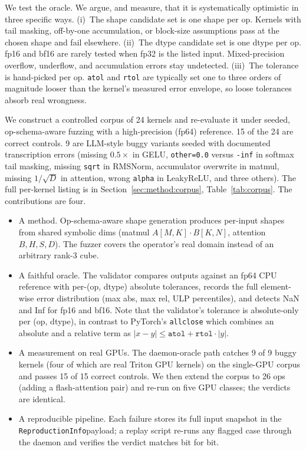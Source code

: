 \documentclass[runningheads]{llncs}
\begin{document}
We test the oracle. We argue, and measure, that it is systematically
optimistic in three specific ways. (i)~The shape candidate set is one
shape per op. Kernels with tail masking, off-by-one accumulation, or
block-size assumptions pass at the chosen shape and fail elsewhere.
(ii)~The dtype candidate set is one dtype per op. fp16 and bf16 are
rarely tested when fp32 is the listed input. Mixed-precision overflow,
underflow, and accumulation errors stay undetected. (iii)~The
tolerance is hand-picked per op. \texttt{atol} and \texttt{rtol} are
typically set one to three orders of magnitude looser than the
kernel's measured error envelope, so loose tolerances absorb real
wrongness.

We construct a controlled corpus of 24 kernels and re-evaluate it
under seeded, op-schema-aware fuzzing with a high-precision (fp64)
reference. 15 of the 24 are correct controls. 9 are LLM-style buggy
variants seeded with documented transcription errors (missing
$0.5\times$ in GELU, \texttt{other=0.0} versus \texttt{-inf} in
softmax tail masking, missing \texttt{sqrt} in RMSNorm, accumulator
overwrite in matmul, missing $1/\sqrt{D}$ in attention, wrong
\texttt{alpha} in LeakyReLU, and three others). The full per-kernel
listing is in Section~\ref{sec:method:corpus}, Table~\ref{tab:corpus}.
The contributions are four.

\begin{itemize}
\item A method. Op-schema-aware shape generation produces per-input
shapes from shared symbolic dims (matmul $A[M,K]\cdot B[K,N]$,
attention $B,H,S,D$). The fuzzer covers the operator's real domain
instead of an arbitrary rank-3 cube.
\item A faithful oracle. The validator compares outputs against an
fp64 CPU reference with per-(op, dtype) absolute tolerances, records
the full element-wise error distribution (max abs, max rel, ULP
percentiles), and detects NaN and Inf for fp16 and bf16. Note that the
validator's tolerance is absolute-only per (op, dtype), in contrast
to PyTorch's \texttt{allclose} which combines an absolute and a
relative term as $|x - y| \leq \texttt{atol} + \texttt{rtol} \cdot
|y|$.
\item A measurement on real GPUs. The daemon-oracle path catches 9 of
9 buggy kernels (four of which are real Triton GPU kernels) on the
single-GPU corpus and passes 15 of 15 correct controls. We then
extend the corpus to 26 ops (adding a flash-attention pair) and
re-run on five GPU classes; the verdicts are identical.
\item A reproducible pipeline. Each failure stores its full input
snapshot in the \texttt{ReproductionInfo}\linebreak[2] payload; a replay script re-runs any
flagged case through the daemon and verifies the verdict matches bit
for bit.
\end{itemize}
\end{document}
